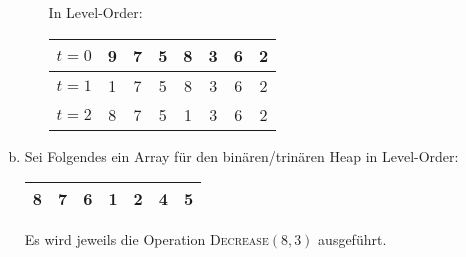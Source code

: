 \documentclass[a4paper]{scrartcl}
\begin{document}
\begin{enumerate}[(a)]
\begin{enumerate}[(i)]
                In Level-Order: \medskip \\
                \begin{tabular}{|l|c|c|c|c|c|c|c|}
                    \hline
                    $t = 0$ & 9 & 7 & 5 & 8 & 3 & 6 & 2 \\ \hline
                    $t = 1$ & 1 & 7 & 5 & 8 & 3 & 6 & 2 \\ \hline
                    $t = 2$ & 8 & 7 & 5 & 1 & 3 & 6 & 2 \\ \hline
                \end{tabular}
        \end{enumerate}

    \item
        Sei Folgendes ein Array für den binären/trinären Heap in Level-Order:
        \medskip \\
        \begin{tabular}{|c|c|c|c|c|c|c|}
            \hline
            8 & 7 & 6 & 1 & 2 & 4 & 5 \\ \hline
        \end{tabular}

        Es wird jeweils die Operation \textsc{Decrease$(8,3)$} ausgeführt.


\end{enumerate}
\end{document}
